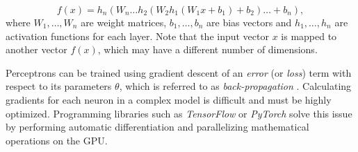 \begin{equation*}
    f(x) = h_n \left(W_n \dots h_2\left( W_2 h_1(W_1x + b_1) + b_2 \right) \dots + b_n\right),
\end{equation*}
where $W_1, \dots, W_n$ are weight matrices, $b_1, \dots, b_n$ are bias vectors and $h_1, \dots, h_n$ are activation functions for each layer. Note that the input vector $x$ is mapped to another vector $f(x)$, which may have a different number of dimensions.

Perceptrons can be trained using gradient descent of an \textit{error} (or \textit{loss}) term with respect to its parameters $\theta$, which is referred to as \textit{back-propagation} \cite{back-propagation}. Calculating gradients for each neuron in a complex model is difficult and must be highly optimized. Programming libraries such as \mbox{\textit{TensorFlow}} \cite{tensorflow} or \textit{PyTorch} \cite{pytorch} solve this issue by performing automatic differentiation and parallelizing mathematical operations on the GPU.
